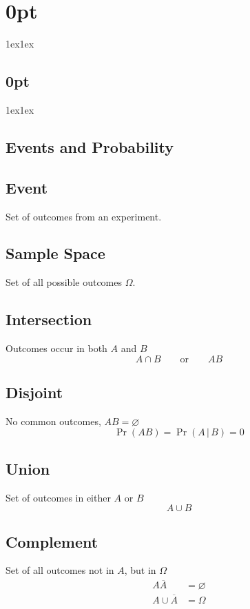 \documentclass{article}
\begin{document}
\titlespacing*\section{0pt}{1ex}{1ex}
\titlespacing*\subsection{0pt}{1ex}{1ex}
%
\setlength\abovecaptionskip{8pt}
\setlength\belowcaptionskip{-15pt}
\setlength\textfloatsep{0pt}
%
\setlength\abovedisplayskip{1pt}
\setlength\belowdisplayskip{1pt}

\begin{multicols}{3}
    \section{Events and Probability}
    \subsection{Event}
    Set of outcomes from an experiment.
    \subsection{Sample Space}
    Set of all possible outcomes \(\Omega\).
    \subsection{Intersection}
    Outcomes occur in both \(A\) and \(B\)
    \begin{equation*}
        A \cap B \quad\quad \text{or} \quad\quad AB
    \end{equation*}
    \subsection{Disjoint}
    No common outcomes, \(AB = \varnothing\)
    \begin{equation*}
        \Pr{\left( AB \right)} = \Pr{\left( A \,\vert\, B \right)} = 0
    \end{equation*}
    \subsection{Union}
    Set of outcomes in either \(A\) or \(B\)
    \begin{equation*}
        A \cup B
    \end{equation*}
    \subsection{Complement}
    Set of all outcomes not in \(A\), but in \(\Omega \)
    \begin{align*}
        A\overline{A}       & = \varnothing \\
        A \cup \overline{A} & = \Omega
    \end{align*}

\end{multicols}
\end{document}
